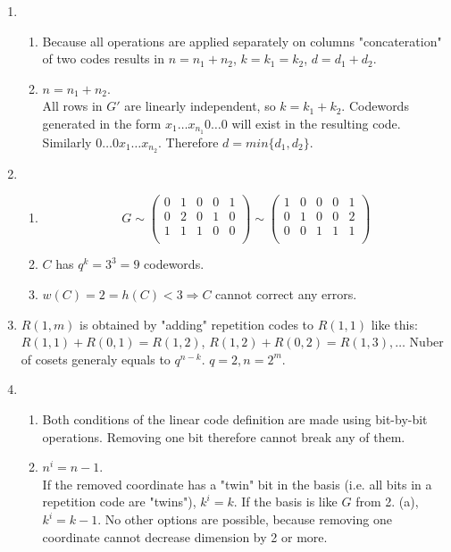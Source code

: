 \documentclass[a4paper,10pt]{article}
\begin{document}
\begin{enumerate}
\begin{enumerate}
    \end{enumerate}
  \item
    \begin{enumerate}
      \item
        Because all operations are applied separately on columns "concateration" of two codes results in $n=n_1+n_2$, $k=k_1=k_2$, $d=d_1+d_2$.
      \item
        $n=n_1+n_2$.\\
        All rows in $G'$ are linearly independent, so $k=k_1+k_2$.
        Codewords generated in the form $x_1\dots x_{n_1}0\dots 0$ will exist in the resulting code. 
        Similarly $0\dots 0x_1\dots x_{n_2}$. Therefore $d=min\{d_1, d_2\}$.
    \end{enumerate}
  \item
    \begin{enumerate}
      \item
        \[
          G\sim
          \begin{pmatrix}
            0&1&0&0&1\\
            0&2&0&1&0\\
            1&1&1&0&0\\
          \end{pmatrix}
          \sim
          \begin{pmatrix}
            1&0&0&0&1\\
            0&1&0&0&2\\
            0&0&1&1&1\\
          \end{pmatrix}
        \]
      \item
        $C$ has $q^k=3^3=9$ codewords.
      \item
        $w(C)=2=h(C)<3\Rightarrow C$ cannot correct any errors.
        
    \end{enumerate}

  \item
    $R(1,m)$ is obtained by "adding" repetition codes to $R(1,1)$ like this: $R(1,1)+R(0,1)=R(1,2)$, $R(1,2)+R(0,2)=R(1,3), \dots$
    Nuber of cosets generaly equals to $q^{n-k}$. $q=2, n=2^m$.
  \item
    \begin{enumerate}
      \item
        Both conditions of the linear code definition are made using bit-by-bit operations. Removing one bit therefore cannot break any of them.
      \item
        $n^i=n-1$.\\
        If the removed coordinate has a "twin" bit in the basis (i.e. all bits in a repetition code are "twins"), $k^i=k$.
        If the basis is like $G$ from 2. (a),$k^i=k-1$. No other options are possible, because removing one coordinate cannot decrease dimension by 2 or more.\\
        
    \end{enumerate}
\end{enumerate}
\end{document}
